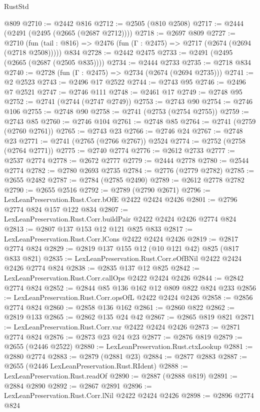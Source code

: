 \begin{lexlean}{RustStd}
\begin{coremodule}
    @809
@2710 := @2442 @816
@2712 := @2505 (@810 @2508)
@2717 := @2444 (@2491 (@2495 (@2665 (@2687 @2712))))
@2718 := @2697 @809
@2727 := @2710
    (fun (tail : @816) => @2476 (fun (Γ : @2475) => @2717 (@2674 (@2694 (@2718 @2508)))))
    @834
@2728 := @2442 @2475
@2733 := @2491 (@2495 (@2665 (@2687 (@2505 @835))))
@2734 := @2444 @2733
@2735 := @2718 @834
@2740 := @2728 (fun (Γ : @2475) => @2734 (@2674 (@2694 @2735)))
@2741 := @2 @2523
@2743 := @2496 @17 @2522
@2744 := @2743 @95
@2746 := @2496 @7 @2521
@2747 := @2746 @111
@2748 := @2461 @17
@2749 := @2748 @95
@2752 := @2741 (@2744 (@2747 @2749))
@2753 := @2743 @90
@2754 := @2746 @106
@2755 := @2748 @90
@2758 := @2741 (@2753 (@2754 @2755))
@2759 := @2743 @85
@2760 := @2746 @104
@2761 := @2748 @85
@2764 := @2741 (@2759 (@2760 @2761))
@2765 := @2743 @23
@2766 := @2746 @24
@2767 := @2748 @23
@2771 := @2741 (@2765 (@2766 @2767)) @2524
@2774 := @2752 (@2758 (@2764 @2771))
@2775 := @2740 @2774
@2776 := @2612 @2733
@2777 := @2537 @2774
@2778 := @2672 @2777
@2779 := @2444 @2778
@2780 := @2544 @2774
@2782 := @2780 @2693 @2735
@2784 := @2776 (@2779 @2782)
@2785 := @2655 @2482
@2787 := @2784 (@2785 @2490)
@2789 := @2612 @2778 @2782
@2790 := @2655 @2516
@2792 := @2789 (@2790 @2671)
@2796 := LexLeanPreservation.Rust.Corr.bOfE @2422 @2424 @2426
@2801 := @2796 @2774 @824 @157 @122 @834
@2807 := LexLeanPreservation.Rust.Corr.buildPair @2422 @2424 @2426 @2774 @824
@2813 := @2807 @137 @153 @12 @121 @825 @833
@2817 := LexLeanPreservation.Rust.Corr.lCons @2422 @2424 @2426
@2819 := @2817 @2774 @824
@2829 := @2819 @137 @155 @12 (@10 @121 @42) @825 (@817 @833 @821)
@2835 := LexLeanPreservation.Rust.Corr.eOfBNil @2422 @2424 @2426 @2774 @824
@2838 := @2835 @137 @12 @825
@2842 := LexLeanPreservation.Rust.Corr.callOps @2422 @2424 @2426
@2844 := @2842 @2774 @824
@2852 := @2844 @85 @136 @162 @12 @809 @822 @824 @233
@2856 := LexLeanPreservation.Rust.Corr.opsOfL @2422 @2424 @2426
@2858 := @2856 @2774 @824
@2860 := @2858 @136 @162
@2861 := @2860 @822
@2862 := @2819 @133
@2865 := @2862 @135 @24 @42
@2867 := @2865 @819 @821
@2871 := LexLeanPreservation.Rust.Corr.var @2422 @2424 @2426
@2873 := @2871 @2774 @824
@2876 := @2873 @23 @24 @23
@2877 := @2876 @819
@2879 := @2655 (@2446 @2522)
@2880 := LexLeanPreservation.Rust.ctxLookup
@2881 := @2880 @2774
@2883 := @2879 (@2881 @23)
@2884 := @2877 @2883
@2887 := @2655 (@2446 LexLeanPreservation.Rust.RIdent)
@2888 := LexLeanPreservation.Rust.readOf
@2890 := @2887 (@2888 @819)
@2891 := @2884 @2890
@2892 := @2867 @2891
@2896 := LexLeanPreservation.Rust.Corr.lNil @2422 @2424 @2426
@2898 := @2896 @2774 @824

\end{coremodule}
\end{lexlean}
